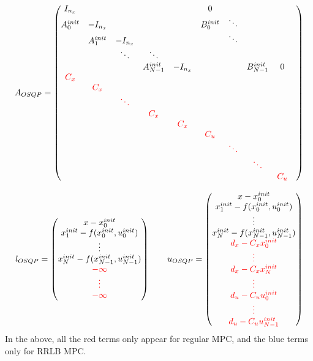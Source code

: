 \documentclass[12pt]{article}
\begin{document}
$$A_{OSQP}=\begin{pmatrix}
	I_{n_x}&&&&&0&&&&\\
	A_{0}^{init}&-I_{n_x}&&&&B_{0}^{init}&\ddots&&\\
	&A_{1}^{init}&-I_{n_x}&&&&\ddots&&\\
	&&\ddots&\ddots&&&&&\\
	&&&A_{N-1}^{init}&-I_{n_x}&&&B_{N-1}^{init}&0\\
	\color{red}C_x&&&&&&&&\\
	&\color{red}C_x&&&&&&&\\
	&&\color{red}\ddots&&&&&&\\
	&&&\color{red}C_x&&&&&\\
	&&&&\color{red}C_x&&&&\\
	&&&&&\color{red}C_u&&&\\
	&&&&&&\color{red}\ddots&&\\
	&&&&&&&\color{red}\ddots&\\
	&&&&&&&&\color{red}C_u
\end{pmatrix}$$

$$l_{OSQP}=\begin{pmatrix}
	x-x_0^{init}\\x_{1}^{init}-f(x_0^{init},u_0^{init})\\\vdots\\x_{N}^{init}-f(x_{N-1}^{init},u_{N-1}^{init})\\\color{red}-\infty\\\color{red}\vdots\\\color{red}-\infty
\end{pmatrix}\qquad u_{OSQP}=\begin{pmatrix}
	x-x_0^{init}\\x_{1}^{init}-f(x_0^{init},u_0^{init})\\\vdots\\x_{N}^{init}-f(x_{N-1}^{init},u_{N-1}^{init})\\\color{red}d_x-C_xx_0^{init}\\\color{red}\vdots\\\color{red}d_x-C_xx_N^{init}\\\color{red}\vdots\\\color{red}d_u-C_uu_{0}^{init}\\\color{red}\vdots\\\color{red}d_u-C_uu_{N-1}^{init}
\end{pmatrix}$$
\normalsize
In the above, all the red terms only appear for regular MPC, and the blue terms only for RRLB MPC.
\end{document}
